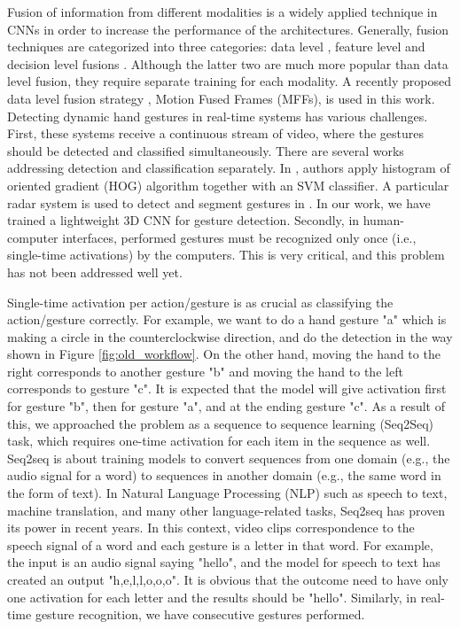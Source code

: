 Fusion of information from different modalities is a widely applied technique in CNNs in order to increase the performance of the architectures.  Generally,  fusion techniques are categorized into three categories: data level \cite{kopuklu2018motion}, feature level \cite{Feichtenhofer2016convolutional, miao2017multimodal}  and decision level fusions \cite{simonyan2014two, molchanov2016online, zhou2017temporal}. Although the latter two are much more popular than data level fusion, they require separate training for each modality. A recently proposed data level fusion strategy  \cite{kopuklu2018motion}, Motion Fused Frames (MFFs), is used in this work. \\

Detecting dynamic hand gestures in real-time systems has various challenges.   First, these systems receive a continuous stream of video, where the gestures should be detected and classified simultaneously.   There are several works addressing detection and classification separately.   In \cite{ohn2014hand}, authors apply histogram of oriented gradient (HOG) algorithm together with an SVM classifier. A particular radar system is used to detect and segment gestures in \cite{molchanov2015multi}.  In our work, we have trained a lightweight 3D CNN for gesture detection.  Secondly, in human-computer interfaces, performed gestures must be recognized only once (i.e., single-time activations) by the computers.  This is very critical, and this problem has not been addressed well yet. 

Single-time activation per action/gesture is as crucial as classifying the action/gesture correctly.  For example, we want to do a hand gesture "a" which is making a circle in the counterclockwise direction, and do the detection in the way shown in Figure \ref{fig:old_workflow}.  On the other  hand,  moving the hand  to the right corresponds  to another gesture  "b"  and  moving the hand  to the  left corresponds  to gesture  "c". It  is expected  that  the  model will give activation  first for gesture  "b", then  for gesture "a", and at the ending gesture "c".  As a result of this, we approached the problem as a sequence to sequence learning  (Seq2Seq) task,  which requires one-time activation for each item in the sequence as well.\\

Seq2seq is about training models to convert sequences from one domain  (e.g., the audio signal for a word) to sequences in another domain (e.g., the same word in the form of text).  In Natural  Language Processing (NLP)  such as speech to text,  machine translation, and many other language-related tasks,  Seq2seq has proven its power in recent years. In this context,  video clips correspondence to the speech signal of a word and each gesture is a letter in that word.  For example, the input is an audio signal saying "hello", and the model for speech to text has created an output "h,e,l,l,o,o,o". It is obvious that the outcome need to have only one activation  for each letter  and the results should be "hello".  Similarly, in real-time gesture recognition, we have consecutive gestures performed.\\

